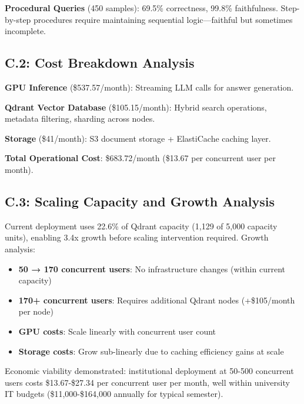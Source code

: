\documentclass[11pt,a4paper,twocolumn]{article}
\begin{document}
\textbf{Procedural Queries} (450 samples): 69.5\% correctness, 99.8\% faithfulness. Step-by-step procedures require maintaining sequential logic—faithful but sometimes incomplete.

\subsection*{C.2: Cost Breakdown Analysis}

\textbf{GPU Inference} (\$537.57/month): Streaming LLM calls for answer generation.

\textbf{Qdrant Vector Database} (\$105.15/month): Hybrid search operations, metadata filtering, sharding across nodes.

\textbf{Storage} (\$41/month): S3 document storage + ElastiCache caching layer.

\textbf{Total Operational Cost}: \$683.72/month (\$13.67 per concurrent user per month).

\subsection*{C.3: Scaling Capacity and Growth Analysis}

Current deployment uses 22.6\% of Qdrant capacity (1,129 of 5,000 capacity units), enabling 3.4x growth before scaling intervention required. Growth analysis:

\begin{itemize}
    \item \textbf{50 → 170 concurrent users}: No infrastructure changes (within current capacity)
    \item \textbf{170+ concurrent users}: Requires additional Qdrant nodes (+\$105/month per node)
    \item \textbf{GPU costs}: Scale linearly with concurrent user count
    \item \textbf{Storage costs}: Grow sub-linearly due to caching efficiency gains at scale
\end{itemize}

Economic viability demonstrated: institutional deployment at 50-500 concurrent users costs \$13.67-\$27.34 per concurrent user per month, well within university IT budgets (\$11,000-\$164,000 annually for typical semester).
\end{document}

